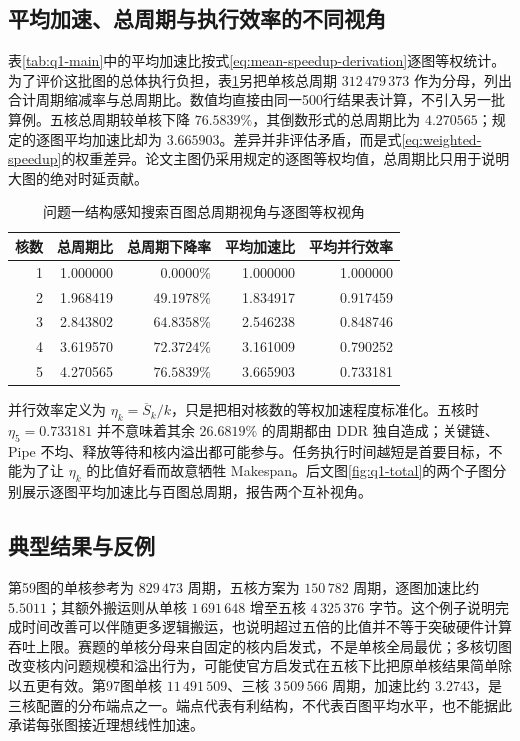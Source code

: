 \subsection{平均加速、总周期与执行效率的不同视角}
表\ref{tab:q1-main}中的平均加速比按式\eqref{eq:mean-speedup-derivation}逐图等权统计。为了评价这批图的总体执行负担，表\ref{tab:q1-aggregate-perspective}另把单核总周期 $312\,479\,373$ 作为分母，列出合计周期缩减率与总周期比。数值均直接由同一500行结果表计算，不引入另一批算例。五核总周期较单核下降 $76.5839\%$，其倒数形式的总周期比为 $4.270565$；规定的逐图平均加速比却为 $3.665903$。差异并非评估矛盾，而是式\eqref{eq:weighted-speedup}的权重差异。论文主图仍采用规定的逐图等权均值，总周期比只用于说明大图的绝对时延贡献。
\begin{table}[!htbp]\centering
\caption{问题一结构感知搜索百图总周期视角与逐图等权视角}\label{tab:q1-aggregate-perspective}
\begin{tabular}{rrrrr}
\toprule
核数 & 总周期比 & 总周期下降率 & 平均加速比 & 平均并行效率\\
\midrule
1 & 1.000000 & $0.0000\%$ & 1.000000 & 1.000000\\
2 & 1.968419 & $49.1978\%$ & 1.834917 & 0.917459\\
3 & 2.843802 & $64.8358\%$ & 2.546238 & 0.848746\\
4 & 3.619570 & $72.3724\%$ & 3.161009 & 0.790252\\
5 & 4.270565 & $76.5839\%$ & 3.665903 & 0.733181\\
\bottomrule
\end{tabular}
\end{table}
并行效率定义为 $\eta_k=\overline S_k/k$，只是把相对核数的等权加速程度标准化。五核时 $\eta_5=0.733181$ 并不意味着其余 $26.6819\%$ 的周期都由 DDR 独自造成；关键链、Pipe 不均、释放等待和核内溢出都可能参与。任务执行时间越短是首要目标，不能为了让 $\eta_k$ 的比值好看而故意牺牲 Makespan。后文图\ref{fig:q1-total}的两个子图分别展示逐图平均加速比与百图总周期，报告两个互补视角。


\subsection{典型结果与反例}
第59图的单核参考为 $829\,473$ 周期，五核方案为 $150\,782$ 周期，逐图加速比约 $5.5011$；其额外搬运则从单核 $1\,691\,648$ 增至五核 $4\,325\,376$ 字节。这个例子说明完成时间改善可以伴随更多逻辑搬运，也说明超过五倍的比值并不等于突破硬件计算吞吐上限。赛题的单核分母来自固定的核内启发式，不是单核全局最优；多核切图改变核内问题规模和溢出行为，可能使官方启发式在五核下比把原单核结果简单除以五更有效。第97图单核 $11\,491\,509$、三核 $3\,509\,566$ 周期，加速比约 $3.2743$，是三核配置的分布端点之一。端点代表有利结构，不代表百图平均水平，也不能据此承诺每张图接近理想线性加速。

